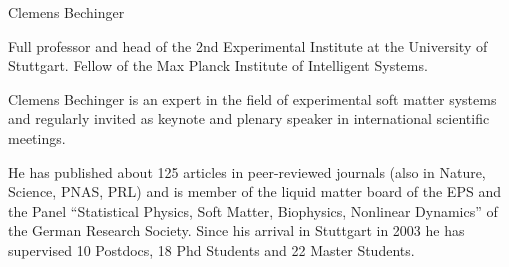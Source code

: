 \begin{participant}[type=R,PM=12,gender=male,salary=5500]{Clemens Bechinger}

Full professor and head of the 2nd Experimental Institute at the University
of Stuttgart. Fellow of the Max Planck Institute of Intelligent Systems.

%

Clemens Bechinger is an expert in the field of experimental soft matter
systems and regularly invited as keynote and plenary speaker in
international scientific meetings.

%

He has published about 125 articles in peer-reviewed journals (also in
Nature, Science, PNAS, PRL) and is member of the liquid matter board of the
EPS and the Panel ``Statistical Physics, Soft Matter, Biophysics, Nonlinear
Dynamics'' of the German Research Society. Since his arrival in Stuttgart in
2003 he has supervised 10 Postdocs, 18 Phd Students and 22 Master Students.

\end{participant}